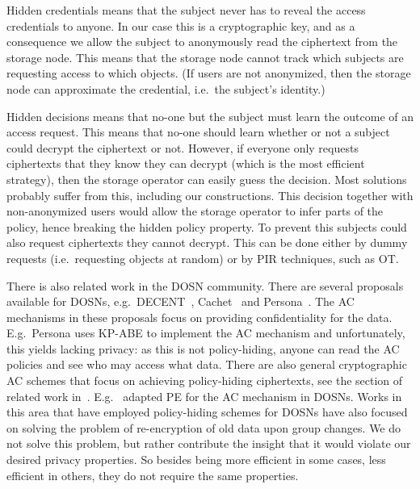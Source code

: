 Hidden credentials means that the subject never has to reveal the access 
credentials to anyone.
In our case this is a cryptographic key, and as a consequence we allow the 
subject to anonymously read the ciphertext from the storage node.
This means that the storage node cannot track which subjects are requesting 
access to which objects.
(If users are not anonymized, then the storage node can approximate the 
credential, i.e.\ the subject's identity.)

Hidden decisions means that no-one but the subject must learn the outcome of an 
access request.
This means that no-one should learn whether or not a subject could decrypt the 
ciphertext or not.
However, if everyone only requests ciphertexts that they know they can decrypt 
(which is the most efficient strategy), then the storage operator can easily 
guess the decision.
Most solutions probably suffer from this, including our constructions.
This decision together with non-anonymized users would allow the storage 
operator to infer parts of the policy, hence breaking the hidden policy 
property.
To prevent this subjects could also request ciphertexts they cannot decrypt.
This can be done either by dummy requests (i.e.\ requesting objects at random) 
or by \ac{PIR} techniques, such as \ac{OT}.


There is also related work in the \ac{DOSN} community.
There are several proposals available for \acp{DOSN}, e.g.\ 
DECENT~\cite{DECENT}, Cachet~\cite{Cachet} and Persona~\cite{Persona}.
The \ac{AC} mechanisms in these proposals focus on providing confidentiality 
for the data.
E.g.\ Persona uses \ac{KP-ABE} to implement the \ac{AC} mechanism and
unfortunately, this yields lacking privacy: as this is not policy-hiding, 
anyone can read the \ac{AC} policies and see who may access what data.
There are also general cryptographic \ac{AC} schemes that focus on achieving 
policy-hiding ciphertexts, see the section of related work 
in~\cite{TowardsPPACwHPHCHD}.
E.g.\ \citet{PEAC} adapted \ac{PE} for the \ac{AC} mechanism in \acp{DOSN}.
Works in this area that have employed policy-hiding schemes for \acp{DOSN} have
also focused on solving the problem of re-encryption of old data upon group 
changes.
We do not solve this problem, but rather contribute the insight that it would 
violate our desired privacy properties.
So besides being more efficient in some cases, less efficient in others, they 
do not require the same properties.


